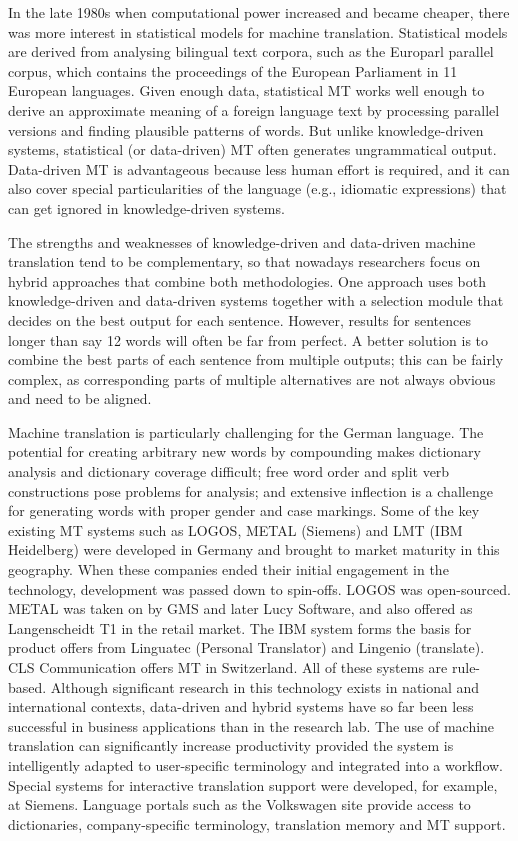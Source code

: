 \documentclass[]{../../metanetpaper}
\begin{document}
\begin{Parallel}[c]{80mm}{80mm}
{    In the late 1980s when computational power increased and became cheaper, there was more interest in statistical models for machine translation. Statistical models are derived from analysing bilingual text corpora, such as the Europarl parallel corpus, which contains the proceedings of the European Parliament in 11 European languages. Given enough data, statistical MT works well enough to derive an approximate meaning of a foreign language text by processing parallel versions and finding plausible patterns of words. But unlike knowledge-driven systems, statistical (or data-driven) MT often generates ungrammatical output. Data-driven MT is advantageous because less human effort is required, and it can also cover special particularities of the language (e.g., idiomatic expressions) that can get ignored in knowledge-driven systems. 

    The strengths and weaknesses of knowledge-driven and data-driven machine translation tend to be complementary, so that nowadays researchers focus on hybrid approaches that combine both methodologies. One approach uses both knowledge-driven and data-driven systems together with a selection module that decides on the best output for each sentence. However, results for sentences longer than say 12 words will often be far from perfect. A better solution is to combine the best parts of each sentence from multiple outputs; this can be fairly complex, as corresponding parts of multiple alternatives are not always obvious and need to be aligned. 

Machine translation is particularly challenging for the German language. The potential for creating arbitrary new words by compounding makes dictionary analysis and 
dictionary coverage difficult; free word order and split verb constructions pose problems for analysis; and extensive inflection is a 
challenge for generating words with proper gender and case markings. 
Some of the key existing MT systems such as LOGOS, METAL (Siemens) and LMT (IBM Heidelberg) were developed in Germany and brought to 
market maturity in this geography. When these companies ended their initial engagement in the technology, development was passed down 
to spin-offs. LOGOS was open-sourced. METAL was taken on by GMS and later Lucy Software, and also offered as Langenscheidt T1 in the 
retail market. The IBM system forms the basis for product offers from Linguatec (Personal Translator) and Lingenio (translate). CLS 
Communication offers MT in Switzerland. All of these systems are rule-based. Although significant research in this technology exists 
in national and international contexts, data-driven and hybrid systems have so far been less successful in business applications than 
in the research lab. 
The use of machine translation can significantly increase productivity provided the system is intelligently adapted to user-specific 
terminology and integrated into a workflow. Special systems for interactive translation support were developed, for example, at 
Siemens. Language portals such as the Volkswagen site provide access to dictionaries, company-specific terminology, translation memory 
and MT support. 

}
\end{Parallel}
\end{document}
